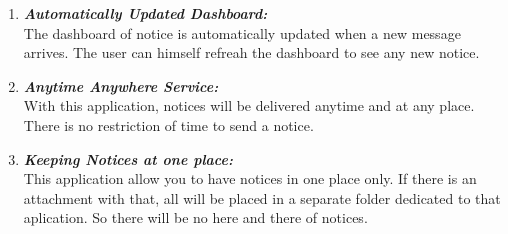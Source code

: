\begin{enumerate}
\item \textbf{\emph{Automatically Updated Dashboard:}}\\
The dashboard of notice is automatically updated when a new message arrives. The user can himself refreah the dashboard 
to see any new notice.

\item \textbf{\emph{Anytime Anywhere Service:}}\\
With this application, notices will be delivered anytime and at any place. There is no restriction of time to 
send a notice.

\item \textbf{\emph{Keeping Notices at one place:}}\\
This application allow you to have notices in one place only. If there is an attachment with that, all will be placed in a separate
folder dedicated to that aplication. So there will be no here and there of notices.
\end{enumerate} 

\pagebreak
